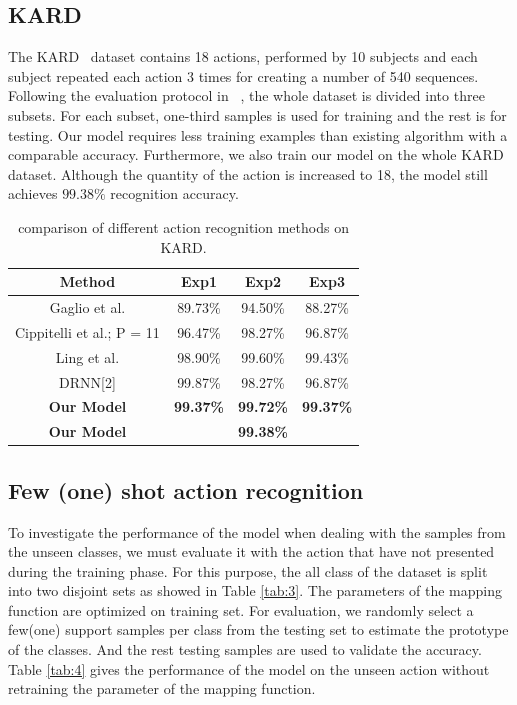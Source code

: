 \documentclass{bmvc2k}
\begin{document}
\subsection*{KARD}
The KARD~\cite{gaglio2015human} dataset contains 18 actions, performed by 10 subjects and each subject repeated each action 3 times for creating a number of 540 sequences. Following the evaluation protocol in ~\cite{pham2017learning}, the whole dataset is divided into three subsets. For each subset, one-third samples is used for training and the rest is for testing. Our model requires less training examples than existing algorithm with a comparable accuracy. Furthermore, we also train our model on the whole KARD dataset. Although the quantity of the action is increased to 18, the model still achieves $99.38\%$ recognition accuracy.

\begin{table}[htb]
	\begin{center}
		\scalebox{1.1}
		{
			\begin{tabular}{|c|c|c|c|}
				\hline
				Method & Exp1 & Exp2 & Exp3 \\
				\hline\hline
				Gaglio et al. & 89.73\% & 94.50\%&88.27\%\\
				Cippitelli et al.; P = 11 & 96.47\% & 98.27\% & 96.87\%\\
				Ling et al. & 98.90\% & 99.60\% & 99.43\%\\
				DRNN[2] & 99.87\% & 98.27\% & 96.87\%\\
				\textbf{Our Model} & \textbf{99.37\%} & \textbf{99.72\%} & \textbf{99.37\%} \\
				\hline
				\textbf{Our Model} &  \multicolumn{3}{|c|}{\textbf{99.38\%}}\\
				\hline
			\end{tabular}
		}
	\end{center}
	\caption{ comparison of different action recognition methods on KARD. }
	\label{tab:2}
\end{table}

\subsection*{Few (one) shot action recognition}
To investigate the performance of the model when dealing with the samples from the unseen classes, we must evaluate it with the action that have not presented during the training phase. For this purpose, the all class of the dataset is split into two disjoint sets as showed in Table \ref{tab:3}. The parameters of the mapping function are optimized on training set. For evaluation, we randomly select a few(one) support samples per class from the testing set to estimate the prototype of the classes. And the rest testing samples are used to validate the accuracy. Table \ref{tab:4} gives the performance of the model on the unseen action without retraining the parameter of the mapping function. 
\end{document}
